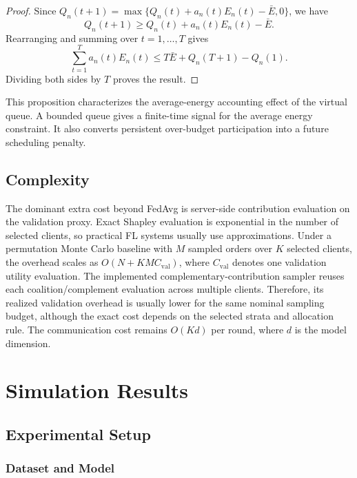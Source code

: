 \documentclass[journal]{IEEEtran}
\begin{document}
\begin{proof}
Since $Q_n(t+1)=\max\{Q_n(t)+a_n(t)E_n(t)-\bar{E},0\}$, we have
\begin{equation}
Q_n(t+1)\geq Q_n(t)+a_n(t)E_n(t)-\bar{E}.
\end{equation}
Rearranging and summing over $t=1,\ldots,T$ gives
\begin{equation}
\sum_{t=1}^{T}a_n(t)E_n(t)
\leq
T\bar{E}+Q_n(T+1)-Q_n(1).
\end{equation}
Dividing both sides by $T$ proves the result.
\end{proof}

This proposition characterizes the average-energy accounting effect of the virtual queue. A bounded queue gives a finite-time signal for the average energy constraint. It also converts persistent over-budget participation into a future scheduling penalty.

\subsection{Complexity}

The dominant extra cost beyond FedAvg is server-side contribution evaluation on the validation proxy. Exact Shapley evaluation is exponential in the number of selected clients, so practical FL systems usually use approximations. Under a permutation Monte Carlo baseline with $M$ sampled orders over $K$ selected clients, the overhead scales as $O(N+KM C_{\mathrm{val}})$, where $C_{\mathrm{val}}$ denotes one validation utility evaluation. The implemented complementary-contribution sampler reuses each coalition/complement evaluation across multiple clients. Therefore, its realized validation overhead is usually lower for the same nominal sampling budget, although the exact cost depends on the selected strata and allocation rule. The communication cost remains $O(Kd)$ per round, where $d$ is the model dimension.

\section{Simulation Results}
\label{sec:experiments}

\subsection{Experimental Setup}

\subsubsection{Dataset and Model}
\end{document}
